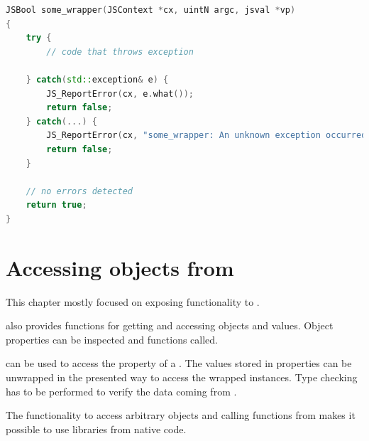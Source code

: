 \SingleSpacing
\begin{lstlisting}[language=C++, caption=Error handling at the language border]
JSBool some_wrapper(JSContext *cx, uintN argc, jsval *vp)
{
	try {
		// code that throws exception
		
	} catch(std::exception& e) {
		JS_ReportError(cx, e.what());
		return false;
	} catch(...) {
		JS_ReportError(cx, "some_wrapper: An unknown exception occurred");
		return false;
	}
	
	// no errors detected
	return true;
}
\end{lstlisting}
\OnehalfSpacing

\section{Accessing  objects from }

This chapter mostly focused on exposing  functionality to .

 also provides functions for getting and accessing  objects and values. Object properties can be inspected and functions called.

 can be used to access the property of a . The values stored in properties can be unwrapped in the presented way to access the wrapped  instances. Type checking has to be performed to verify the data coming from .

The functionality to access arbitrary  objects and calling  functions from  makes it possible to use  libraries from native code.